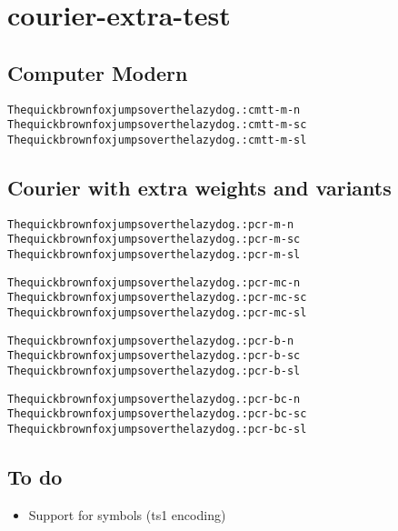 \documentclass{article}
\newcommand{\quickbrownfox}{\textparagraph{} The quick brown fox jumps over the lazy dog.}
\begin{document}
\section{courier-extra-test}

\subsection{Computer Modern}

\begin{alltt}
\quickbrownfox{} : cmtt-m-n
\quickbrownfox{} : cmtt-m-sc
\quickbrownfox{} : cmtt-m-sl
\end{alltt}

\subsection{Courier with extra weights and variants}

\begin{alltt}
\quickbrownfox{} : pcr-m-n
\quickbrownfox{} : pcr-m-sc
\quickbrownfox{} : pcr-m-sl

\quickbrownfox{} : pcr-mc-n
\quickbrownfox{} : pcr-mc-sc
\quickbrownfox{} : pcr-mc-sl

\quickbrownfox{} : pcr-b-n
\quickbrownfox{} : pcr-b-sc
\quickbrownfox{} : pcr-b-sl

\quickbrownfox{} : pcr-bc-n
\quickbrownfox{} : pcr-bc-sc
\quickbrownfox{} : pcr-bc-sl
\end{alltt}

\subsection{To do}
\begin{itemize}
  \item Support for symbols (ts1 encoding)
\end{itemize}
\end{document}
